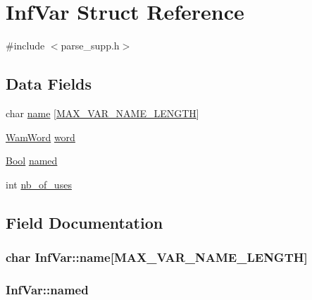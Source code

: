 \hypertarget{structInfVar}{}\section{Inf\+Var Struct Reference}
\label{structInfVar}


{\ttfamily \#include $<$parse\+\_\+supp.\+h$>$}

\subsection*{Data Fields}
\begin{DoxyCompactItemize}
\item 
char \hyperlink{structInfVar_a0dc32a42fe7338b19884288c0e63b35f}{name} \mbox{[}\hyperlink{b__params_8h_a50bd85ce2ed14f876d5f8faac0adba86}{M\+A\+X\+\_\+\+V\+A\+R\+\_\+\+N\+A\+M\+E\+\_\+\+L\+E\+N\+G\+TH}\mbox{]}
\item 
\hyperlink{LINUX__SIGSEGV_8c_a10ea8be8823feb38875b8a9326cbb424}{Wam\+Word} \hyperlink{structInfVar_acc66e228f4cfbb1ab828b0bb95a69621}{word}
\item 
\hyperlink{bool_8h_afdcfe6db5bea87bd493a3fe2c513d5ef}{Bool} \hyperlink{structInfVar_a56bb3da1e5f14c34e30d702852740a39}{named}
\item 
int \hyperlink{structInfVar_a38f07afe6ae0ae7f591cf95796469f83}{nb\+\_\+of\+\_\+uses}
\end{DoxyCompactItemize}


\subsection{Field Documentation}
\subsubsection[{\texorpdfstring{name}{name}}]{\setlength{\rightskip}{0pt plus 5cm}char Inf\+Var\+::name\mbox{[}{\bf M\+A\+X\+\_\+\+V\+A\+R\+\_\+\+N\+A\+M\+E\+\_\+\+L\+E\+N\+G\+TH}\mbox{]}}\hypertarget{structInfVar_a0dc32a42fe7338b19884288c0e63b35f}{}\label{structInfVar_a0dc32a42fe7338b19884288c0e63b35f}
\subsubsection[{\texorpdfstring{named}{named}}]{ Inf\+Var\+::named}\hypertarget{structInfVar_a56bb3da1e5f14c34e30d702852740a39}{}\label{structInfVar_a56bb3da1e5f14c34e30d702852740a39}
